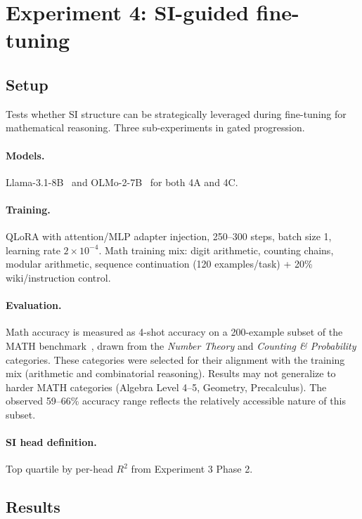 \documentclass{article}
\begin{document}
\section{Experiment 4: SI-guided fine-tuning}
\label{app:exp4}

\subsection{Setup}

Tests whether SI structure can be strategically leveraged during fine-tuning for mathematical
reasoning. Three sub-experiments in gated progression.

\paragraph{Models.} Llama-3.1-8B~\citep{dubey2024llama3} and
OLMo-2-7B~\citep{groeneveld2024olmo} for both 4A and 4C.

\paragraph{Training.} QLoRA with attention/MLP adapter injection, 250--300 steps, batch
size 1, learning rate $2 \times 10^{-4}$. Math training mix: digit arithmetic, counting
chains, modular arithmetic, sequence continuation (120 examples/task) + 20\% wiki/instruction
control.

\paragraph{Evaluation.} Math accuracy is measured as 4-shot accuracy on a 200-example
subset of the MATH benchmark~\citep{hendrycks2021math}, drawn from the \emph{Number Theory}
and \emph{Counting \& Probability} categories. These categories were selected for their
alignment with the training mix (arithmetic and combinatorial reasoning). Results may not
generalize to harder MATH categories (Algebra Level 4--5, Geometry, Precalculus). The
observed 59--66\% accuracy range reflects the relatively accessible nature of this subset.

\paragraph{SI head definition.} Top quartile by per-head $R^2$ from Experiment 3 Phase 2.

\subsection{Results}
\end{document}
